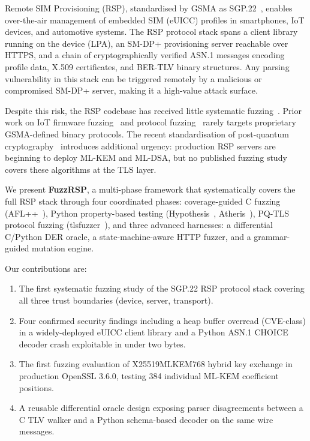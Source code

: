 \documentclass[final,3p,times,twocolumn]{elsarticle}
\begin{document}
Remote SIM Provisioning (RSP), standardised by GSMA as SGP.22~\cite{gsma_sgp22},
enables over-the-air management of embedded SIM (eUICC) profiles in smartphones,
IoT devices, and automotive systems.
The RSP protocol stack spans a client library running on the device (LPA), an
SM-DP+ provisioning server reachable over HTTPS, and a chain of cryptographically
verified ASN.1 messages encoding profile data, X.509 certificates, and BER-TLV
binary structures.
Any parsing vulnerability in this stack can be triggered remotely by a malicious
or compromised SM-DP+ server, making it a high-value attack surface.

Despite this risk, the RSP codebase has received little systematic
fuzzing~\cite{aflpp,klees2018evaluating}.
Prior work on IoT firmware fuzzing~\cite{firmfuzz,chen2016towards} and
protocol fuzzing~\cite{tlsfuzzer_repo,pham2020aflnet} rarely targets
proprietary GSMA-defined binary protocols.
The recent standardisation of post-quantum cryptography~\cite{nist_fips203,
nist_fips204} introduces additional urgency: production RSP servers are beginning
to deploy ML-KEM and ML-DSA, but no published fuzzing study covers these
algorithms at the TLS layer.

We present \textbf{FuzzRSP}, a multi-phase framework that
systematically covers the full RSP stack through four coordinated phases:
coverage-guided C fuzzing (AFL++~\cite{aflpp}), Python property-based testing
(Hypothesis~\cite{hypothesis}, Atheris~\cite{atheris}), PQ-TLS protocol fuzzing
(tlsfuzzer~\cite{tlsfuzzer_repo}), and three advanced harnesses: a
differential C/Python DER oracle, a state-machine-aware HTTP fuzzer, and a
grammar-guided mutation engine.

Our contributions are:
\begin{enumerate}[leftmargin=*,topsep=2pt,itemsep=0pt]
\item The first systematic fuzzing study of the SGP.22 RSP protocol stack covering
  all three trust boundaries (device, server, transport).
\item Four confirmed security findings including a heap buffer overread
  (CVE-class) in a widely-deployed eUICC client library and a Python ASN.1
  CHOICE decoder crash exploitable in under two bytes.
\item The first fuzzing evaluation of X25519MLKEM768 hybrid key exchange in
  production OpenSSL 3.6.0, testing 384 individual ML-KEM coefficient positions.
\item A reusable differential oracle design exposing parser disagreements between
  a C TLV walker and a Python schema-based decoder on the same wire messages.
\end{enumerate}
\end{document}
